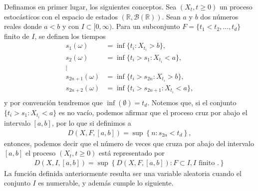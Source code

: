 Definamos en primer lugar, los siguientes conceptos. Sea $(X_t, t \geq 0)$ un proceso estocásticos con el espacio de estados $(\mathbb{R}, \mathcal{B}(\mathbb{R}))$. Sean $a$ y $b$ dos números reales donde $a < b$ y con $I \subset [0, \infty)$. Para un subconjunto $F = \{t_1 < t_2, \ldots, t_d\}$ finito de $I$, se definen los tiempos
\begin{align*}
	s_1(\omega) & = \inf \{t_i : X_{t_i} > b\}, \\
    s_2(\omega) & = \inf \{t_i > s_1 : X_{t_i} < a\}, \\
    \vdots \\
    s_{2n + 1}(\omega) & = \inf \{ t_i > s_{2n} : X_{t_i} > b \}, \\
    s_{2n + 2}(\omega) & = \inf \{ t_i > s_{2n + 1} : X_{t_i} < a \}, \\
\end{align*}
y por convención tendremos que $\inf(\emptyset) = t_d$. Notemos que, si el conjunto $\{t_i > s_1 : X_{t_i} < a\}$ es no vacío, podemos afirmar que el proceso cruz por abajo el intervalo $[a, b]$, por lo que si definimos a
\begin{align*}
	D(X, F, [a, b]) = \sup \left\{ n : s_{2n} < t_d \right\},
\end{align*}
entonces, podemos decir que el número de veces que cruza por abajo del intervalo $[a, b]$ el proceso $(X_t, t \geq 0)$ está representado por
\begin{align}
	D(X, I, [a, b]) = \sup \left\{ D(X, F, [a, b]) : F \subset I, I \text{ finito }. \right\}
\end{align}
La función definida anteriormente resulta ser una variable aleatoria cuando el conjunto $I$ es numerable, y además cumple lo siguiente.

